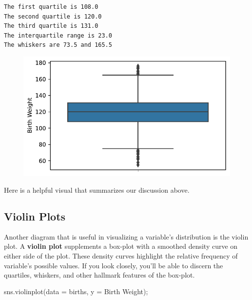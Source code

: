 \documentclass[
  letterpaper,
  DIV=11,
  numbers=noendperiod]{scrreprt}
\newenvironment{Shaded}{\begin{snugshade}}{\end{snugshade}}
\newcommand{\NormalTok}[1]{\textcolor[rgb]{0.00,0.23,0.31}{#1}}
\newcommand{\OperatorTok}[1]{\textcolor[rgb]{0.37,0.37,0.37}{#1}}
\newcommand{\StringTok}[1]{\textcolor[rgb]{0.13,0.47,0.30}{#1}}
\begin{document}
\begin{verbatim}
The first quartile is 108.0
The second quartile is 120.0
The third quartile is 131.0
The interquartile range is 23.0
The whiskers are 73.5 and 165.5
\end{verbatim}

\begin{figure}[H]

{\centering \includegraphics{visualization_1/visualization_1_files/figure-pdf/cell-18-output-2.pdf}

}

\end{figure}

Here is a helpful visual that summarizes our discussion above.

\hypertarget{violin-plots}{%
\subsection{Violin Plots}\label{violin-plots}}

Another diagram that is useful in visualizing a variable's distribution
is the violin plot. A \textbf{violin plot} supplements a box-plot with a
smoothed density curve on either side of the plot. These density curves
highlight the relative frequency of variable's possible values. If you
look closely, you'll be able to discern the quartiles, whiskers, and
other hallmark features of the box-plot.

\begin{Shaded}
\begin{Highlighting}[]
\NormalTok{sns.violinplot(data }\OperatorTok{=}\NormalTok{ births, y }\OperatorTok{=} \StringTok{\textquotesingle{}Birth Weight\textquotesingle{}}\NormalTok{)}\OperatorTok{;}
\end{Highlighting}
\end{Shaded}
\end{document}
